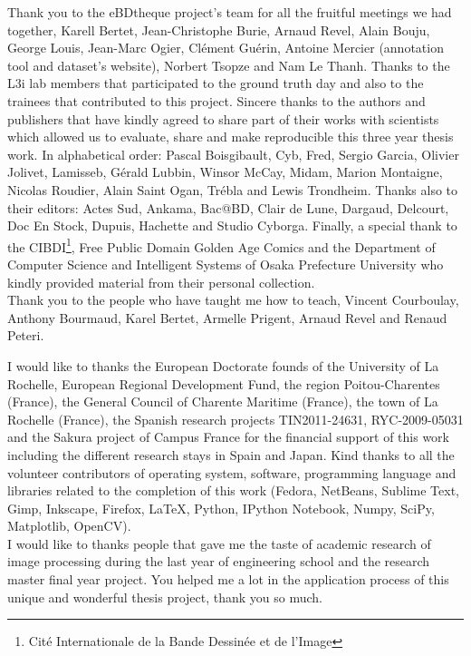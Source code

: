 Thank you to the eBDtheque project's team for all the fruitful meetings we had together, Karell Bertet, Jean-Christophe Burie, Arnaud Revel, Alain Bouju, George Louis, Jean-Marc Ogier, Cl\'{e}ment Gu\'{e}rin, Antoine Mercier (annotation tool and dataset's website), Norbert Tsopze and Nam Le Thanh.
Thanks to the L3i lab members that participated to the ground truth day and also to the trainees that contributed to this project.
Sincere thanks to the authors and publishers that have kindly agreed to share part of their works with scientists which allowed us to evaluate, share and make reproducible this three year thesis work.
In alphabetical order: Pascal Boisgibault, Cyb, Fred, Sergio Garcia, Olivier Jolivet, Lamisseb, G\'{e}rald Lubbin, Winsor McCay, Midam, Marion Montaigne, Nicolas Roudier, Alain Saint Ogan, Tr\'ebla and Lewis Trondheim.
Thanks also to their editors: Actes Sud, Ankama, Bac@BD, Clair de Lune, Dargaud, Delcourt, Doc En Stock, Dupuis, Hachette and Studio Cyborga.
Finally, a special thank to the CIBDI\footnote{Cit\'e Internationale de la Bande Dessin\'ee et de l'Image}, Free Public Domain Golden Age Comics and the Department of Computer Science and Intelligent Systems of Osaka Prefecture University who kindly provided material from their personal collection.
\\


Thank you to the people who have taught me how to teach, Vincent Courboulay, Anthony Bourmaud, Karel Bertet, Armelle Prigent, Arnaud Revel and Renaud Peteri.

I would like to thanks the European Doctorate founds of the  University of La Rochelle, European Regional Development Fund, the region Poitou-Charentes (France), the General Council of Charente Maritime (France), the town of La Rochelle (France), the Spanish research projects TIN2011-24631, RYC-2009-05031 and the Sakura project of Campus France for the financial support of this work including the different research stays in Spain and Japan.
Kind thanks to all the volunteer contributors of operating system, software, programming language and libraries related to the completion of this work (Fedora, NetBeans, Sublime Text, Gimp, Inkscape, Firefox, \LaTeX, Python, IPython Notebook, Numpy, SciPy, Matplotlib, OpenCV).
\\

I would like to thanks people that gave me the taste of academic research of image processing during the last year of engineering school and the research master final year project.
You helped me a lot in the application process of this unique and wonderful thesis project, thank you so much.
\\

